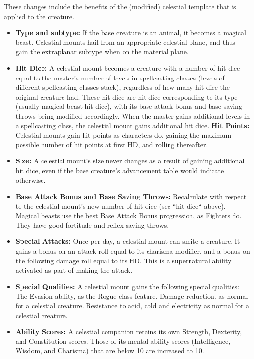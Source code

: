 These changes include the benefits of the (modified) celestial template that is applied to the creature.
\begin{itemize}
 \item \textbf{Type and subtype:} If the base creature is an animal, it becomes a magical beast.
 Celestial mounts hail from an appropriate celestial plane, and thus gain the extraplanar subtype when on the material plane.
 \item \textbf{Hit Dice:} A celestial mount becomes a creature with a number of hit dice equal to the master's number of levels in spellcasting classes 
 (levels of different spellcasting classes stack), 
 regardless of how many hit dice the original creature had. 
 These hit dice are hit dice corresponding to its type (usually magical beast hit dice), with its base attack bonus and base saving throws being modified accordingly.
 When the master gains additional levels in a spellcasting class, the celestial mount gains additional hit dice. 
 \subitem \textbf{Hit Points:} Celestial mounts gain hit points as characters do, gaining the maximum possible number of hit points at first HD, 
 and rolling thereafter.
 \item \textbf{Size:} A celestial mount's size never changes as a result of gaining additional hit dice, even if the base creature's advancement table would indicate otherwise.
 \item \textbf{Base Attack Bonus and Base Saving Throws:} Recalculate with respect to the celestial mount's new number of hit dice (see ``hit dice`` above). 
 Magical beasts use the best Base Attack Bonus progression, as Fighters do. They have good fortitude and reflex saving throws.
 \item \textbf{Special Attacks:} Once per day, a celestial mount can smite a creature.
 It gains a bonus on an attack roll equal to its charisma modifier, and a bonus on the following damage roll equal to its HD.
 This is a supernatural ability activated as part of making the attack.
 \item \textbf{Special Qualities:} A celestial mount gains the following special qualities:
 \subitem The Evasion ability, as the Rogue class feature.
 \subitem Damage reduction, as normal for a celestial creature.
 \subitem Resistance to acid, cold and electricity as normal for a celestial creature.
 \item \textbf{Ability Scores:} A celestial companion retains its own Strength, Dexterity, and Constitution scores. 
 Those of its mental ability scores (Intelligence, Wisdom, and Charisma) that are below 10 are increased to 10.

\end{itemize}
